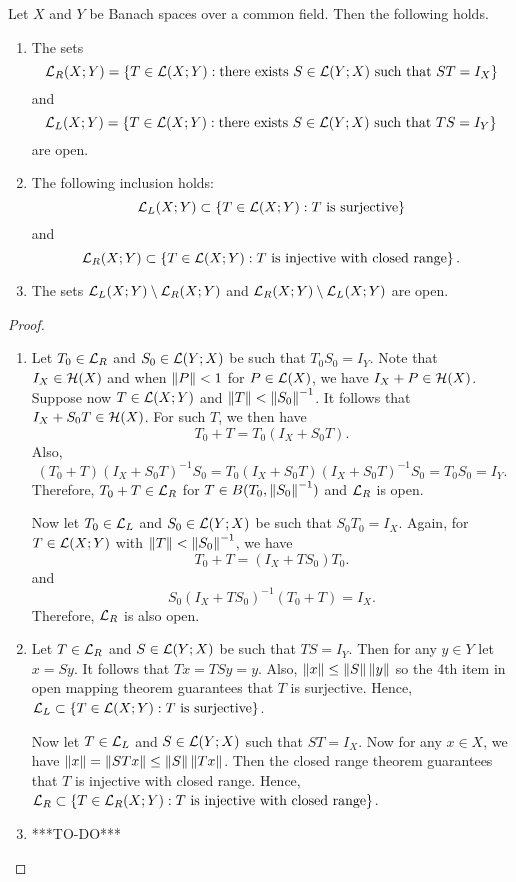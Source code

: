 \documentclass[a4paper]{article}
\begin{document}
\begin{thm}
Let $X$ and $Y$ be Banach spaces over a common field. Then the following holds.
\begin{enumerate}
    \item The sets 
    \[
    \mathcal{L}_R(X; Y) = \left\{ T \in \mathcal{L}(X; Y) : \text{there exists $S \in \mathcal{L}(Y; X)$ such that $ST = I_X$} \right\}
    \]
    and 
    \[
    \mathcal{L}_L(X; Y) = \left\{ T \in \mathcal{L}(X; Y) : \text{there exists $S \in \mathcal{L}(Y; X)$ such that $TS = I_Y$} \right\}
    \]
    are open.
    \item The following inclusion holds: 
    \[
    \mathcal{L}_L(X; Y) \subset \left\{ T \in \mathcal{L}(X; Y) : \text{$T$ is surjective} \right\}
    \]
    and 
    \[
    \mathcal{L}_R(X; Y) \subset \left\{ T \in \mathcal{L}(X; Y) : \text{$T$ is injective with closed range} \right\}.
    \]
    \item The sets $\mathcal{L}_L(X; Y) \setminus \mathcal{L}_R(X; Y)$ and $\mathcal{L}_R(X; Y) \setminus \mathcal{L}_L(X; Y)$ are open.
\end{enumerate}
\end{thm}

\begin{proof}
\begin{enumerate}
\item Let $T_0 \in \mathcal{L}_R$ and $S_0 \in \mathcal{L}(Y; X)$ be such that 
$T_0 S_0 = I_Y$. Note that $I_X \in \mathcal{H}(X)$ and when $\left\lVert P\right\rVert < 1$
for $P \in \mathcal{L}(X)$, we have $I_X + P \in \mathcal{H}(X)$. Suppose now 
$T \in \mathcal{L}(X; Y)$ and $\left\lVert T\right\rVert < \left\lVert S_0\right\rVert^{-1}$. It follows that 
$I_X + S_0 T \in \mathcal{H}(X)$. For such $T$, we then have 
\[
T_0 + T = T_0 (I_X + S_0 T).
\]
Also, 
\[
(T_0 + T) (I_X + S_0 T)^{-1} S_0 = T_0 (I_X + S_0 T) (I_X + S_0 T)^{-1} S_0
= T_0 S_0 = I_Y.
\]
Therefore, $T_0 + T \in \mathcal{L}_R$ for $T \in B(T_0, \left\lVert S_0\right\rVert^{-1})$ 
and $\mathcal{L}_R$ is open.

Now let $T_0 \in \mathcal{L}_L$ and $S_0 \in \mathcal{L}(Y; X)$ be such that 
$S_0 T_0 = I_X$. Again, for $T \in \mathcal{L}(X; Y)$ with 
$\left\lVert T\right\rVert < \left\lVert S_0\right\rVert^{-1}$, we have 
\[
T_0 + T = (I_X + T S_0) T_0.
\]
and 
\[
S_0 (I_X + T S_0)^{-1} (T_0 + T) = I_X.
\]
Therefore, $\mathcal{L}_R$ is also open.

\item Let $T \in \mathcal{L}_R$ and $S \in \mathcal{L}(Y; X)$ be such that 
$TS = I_Y$. Then for any $y \in Y$ let $x = Sy$. It follows 
that $Tx = TSy = y$. Also, $\left\lVert x\right\rVert \leq \left\lVert S\right\rVert \left\lVert y\right\rVert$
so the 4th item in open mapping theorem guarantees that $T$ is 
surjective. Hence, $\mathcal{L}_L \subset \left\{ T \in \mathcal{L}(X; Y) :  
\text{$T$ is surjective}\right\}$.

Now let $T \in \mathcal{L}_L$ and $S \in \mathcal{L}(Y; X)$ such that 
$ST = I_X$. Now for any $x \in X$, we have $\left\lVert x\right\rVert 
= \left\lVert STx\right\rVert \leq \left\lVert S\right\rVert \left\lVert Tx\right\rVert$. Then the closed 
range theorem guarantees that $T$ is injective with closed 
range. Hence, $\mathcal{L}_R \subset \left\{ T \in \mathcal{L}_R(X; Y) : 
\text{$T$ is injective with closed range} \right\}$.

\item ***TO-DO***
\end{enumerate}
\end{proof}
\end{document}
